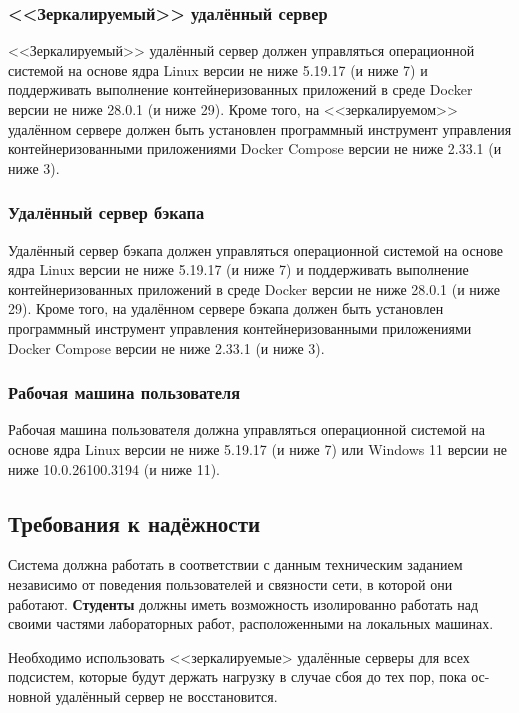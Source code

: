 \documentclass{bmstu}
\begin{document}
  \subsubsection{<<Зеркалируемый>> удалённый сервер}
  
  <<Зеркалируемый>> удалённый сервер должен управляться операционной системой на основе
  ядра Linux версии не ниже 5.19.17 (и ниже 7) и поддерживать
  выполнение контейнеризованных приложений в среде Docker версии не
  ниже 28.0.1 (и ниже 29).
  Кроме того, на <<зеркалируемом>> удалённом сервере должен быть установлен программный
  инструмент управления контейнеризованными приложениями Docker
  Compose версии не ниже 2.33.1 (и ниже 3).
  
  \subsubsection{Удалённый сервер бэкапа}
  
  Удалённый сервер бэкапа должен управляться операционной системой на основе
  ядра Linux версии не ниже 5.19.17 (и ниже 7) и поддерживать
  выполнение контейнеризованных приложений в среде Docker версии не
  ниже 28.0.1 (и ниже 29).
  Кроме того, на удалённом сервере бэкапа должен быть установлен программный
  инструмент управления контейнеризованными приложениями Docker
  Compose версии не ниже 2.33.1 (и ниже 3).

  \subsubsection{Рабочая машина пользователя}

  Рабочая машина пользователя должна управляться операционной системой
  на основе ядра Linux версии не ниже 5.19.17 (и ниже 7) или Windows
  11 версии не ниже 10.0.26100.3194 (и ниже 11).

  \subsection{Требования к надёжности}

  Система должна работать в соответствии с данным техническим заданием
  независимо от поведения пользователей и связности сети, в которой
  они работают.
  \textbf{Студенты} должны иметь возможность изолированно работать над своими
  частями лабораторных работ, расположенными на локальных машинах.
  
  Необходимо использовать <<зеркалируемые> удалённые серверы для всех
  подсистем, которые будут держать нагрузку в случае сбоя до тех пор, пока ос-
  новной удалённый сервер не восстановится.
  
\end{document}
